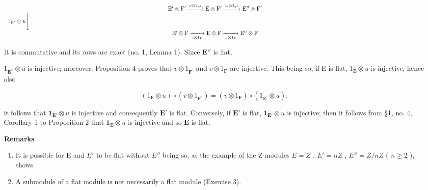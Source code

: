 \[
\begin{array}{c} \mathrm{E} ^ {\prime} \otimes \mathrm{F} ^ {\prime} \xrightarrow {v \otimes 1 _ {\mathrm{F} ^ {\prime}}} \mathrm{E} \otimes \mathrm{F} ^ {\prime} \xrightarrow {w \otimes 1 _ {\mathrm{F} ^ {\prime}}} \mathrm{E} ^ {\prime \prime} \otimes \mathrm{F} ^ {\prime} \\ 1 _ {\mathrm{E} ^ {\prime}} \otimes u \Bigg \downarrow \qquad \qquad \qquad \qquad \qquad \qquad \qquad \qquad \qquad \qquad \qquad \qquad \qquad \qquad \qquad \qquad \qquad \qquad \qquad \qquad \qquad \qquad \qquad \qquad \qquad \qquad \qquad \qquad \qquad \qquad \qquad \qquad \qquad \qquad \\ \mathrm{E} ^ {\prime} \otimes \mathrm{F} \xrightarrow [ v \otimes 1 _ {\mathrm{F}} ]{} \mathrm{E} \otimes \mathrm{F} \xrightarrow [ w \otimes 1 _ {\mathrm{F}} ]{} \mathrm{E} ^ {\prime \prime} \otimes \mathrm{F} \end{array}
\]

It is commutative and its rows are exact (no. 1, Lemma 1). Since \(\mathbf{E}''\) is flat,

\(1_{\mathbf{E}^{\prime \prime}} \otimes u\) is injective; moreover, Proposition 4 proves that \(v \otimes 1_{\mathbf{F}^{\prime}}\) and \(v \otimes 1_{\mathbf{F}}\) are injective. This being so, if E is flat, \(1_{\mathbf{E}} \otimes u\) is injective, hence also

\[
\left(1 _ {\mathbf {E}} \otimes u\right) \circ (v \otimes 1 _ {\mathbf {F} ^ {\prime}}) = (v \otimes 1 _ {\mathbf {F}}) \circ \left(1 _ {\mathbf {E} ^ {\prime}} \otimes u\right);
\]

it follows that \(\mathbf{1}_{\mathbf{E}'} \otimes u\) is injective and consequently \(\mathbf{E}'\) is flat. Conversely, if \(\mathbf{E}'\) is flat, \(\mathbf{1}_{\mathbf{E}'} \otimes u\) is injective; then it follows from §1, no. 4, Corollary 1 to Proposition 2 that \(\mathbf{1}_{\mathbf{E}} \otimes u\) is injective and so \(\mathbf{E}\) is flat.

\textbf{Remarks}\par

\begin{enumerate}
\def\labelenumi{(\arabic{enumi})}
\item
  It is possible for E and \(E'\) to be flat without \(E''\) being so, as the example of the Z-modules \(E = Z\) , \(E' = nZ\) , \(E'' = Z/nZ\) ( \(n \geqslant 2\) ), shows.
\item
  A submodule of a flat module is not necessarily a flat module (Exercise 3).
\end{enumerate}

